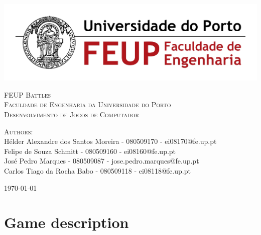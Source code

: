 \documentclass[11pt,a4paper]{report}
\begin{document}
\renewcommand{\thechapter}{}
\renewcommand{\chaptername}{}
\renewcommand{\thesection}{}

\begin{titlepage}

\begin{center}

\includegraphics{feup}  

\vspace{10 mm}

\textsc{\LARGE FEUP Battles} \\
\vspace{20 mm}
\textsc{\normalsize Faculdade de Engenharia da Universidade do Porto} \\
\textsc{\normalsize Desenvolvimento de Jogos de Computador} \\
\vspace{20 mm}



\vfill
\textsc{Authors:}\\
H\'elder Alexandre dos Santos Moreira - 080509170 - ei08170@fe.up.pt \\
Felipe de Souza Schmitt - 080509160 - ei08160@fe.up.pt \\
Jos\'e Pedro Marques - 080509087 - jose.pedro.marques@fe.up.pt \\
Carlos Tiago da Rocha Babo - 080509118 - ei08118@fe.up.pt

\vspace{5 mm}

{\large \today}

\end{center}

\end{titlepage}

\newpage

\tableofcontents
\setcounter{tocdepth}{1}

\newpage

\chapter{Game description}
\end{document}
